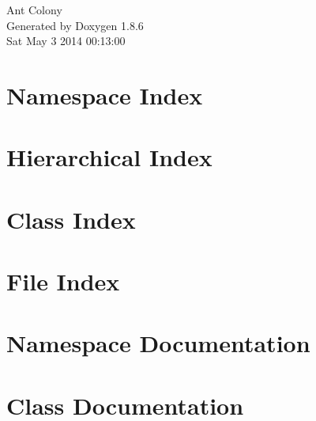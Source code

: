 \documentclass[twoside]{book}
\newcommand{\+}{\discretionary{\mbox{\scriptsize$\hookleftarrow$}}{}{}}
\newcommand{\clearemptydoublepage}{%
  \newpage{\pagestyle{empty}\cleardoublepage}%
}
\begin{document}
\hypersetup{pageanchor=false,
             bookmarks=true,
             bookmarksnumbered=true,
             pdfencoding=unicode
            }
\begin{titlepage}
\vspace*{7cm}
\begin{center}%
{\Large Ant Colony }\\
\vspace*{1cm}
{\large Generated by Doxygen 1.8.6}\\
\vspace*{0.5cm}
{\small Sat May 3 2014 00:13:00}\\
\end{center}
\end{titlepage}
\clearemptydoublepage
\tableofcontents
\clearemptydoublepage
{}
\hypersetup{pageanchor=true}

\chapter{Namespace Index}

\chapter{Hierarchical Index}

\chapter{Class Index}

\chapter{File Index}

\chapter{Namespace Documentation}







\chapter{Class Documentation}




















\end{document}
